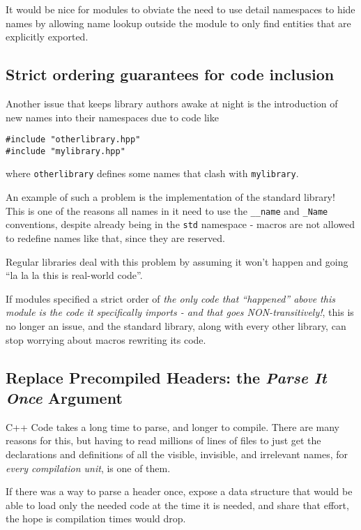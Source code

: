 \documentclass[reqno]{article}
\begin{document}
\begin{multicols}{2}
It would be nice for modules to obviate the need to use detail namespaces to
hide names by allowing name lookup outside the module to only find entities that
are explicitly exported.


\subsection{Strict ordering guarantees for code inclusion}

Another issue that keeps library authors awake at night is the introduction of
new names into their namespaces due to code like

\begin{verbatim}
#include "otherlibrary.hpp"
#include "mylibrary.hpp"
\end{verbatim}

where \texttt{otherlibrary} defines some names that clash with
\texttt{mylibrary}.

An example of such a problem is the implementation of the standard library! This
is one of the reasons all names in it need to use the \texttt{\_\_name} and
\texttt{\_Name} conventions, despite already being in the \texttt{std} namespace
- macros are not allowed to redefine names like that, since they are reserved.

Regular libraries deal with this problem by assuming it won't happen and going
“la la la this is real-world code”.

If modules specified a strict order of \emph{the only code that “happened”
above this module is the code it specifically imports - and that goes
NON-transitively!}, this is no longer an issue, and the standard library, along
with every other library, can stop worrying about macros rewriting its code.


\subsection{Replace Precompiled Headers: the \emph{Parse It Once} Argument}

C++ Code takes a long time to parse, and longer to compile. There are many
reasons for this, but having to read millions of lines of files to just get the
declarations and definitions of all the visible, invisible, and irrelevant
names, for \emph{every compilation unit}, is one of them.

If there was a way to parse a header once, expose a data structure that would be
able to load only the needed code at the time it is needed, and share that
effort, the hope is compilation times would drop.



\end{multicols}
\end{document}
